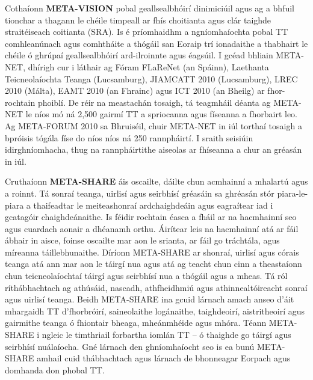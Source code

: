 \begin{multicols}{2}
Cothaíonn \textbf{META-VISION} pobal geallsealbhóirí dinimiciúil agus ag a bhfuil tionchar a thagann le chéile timpeall ar fhís choitianta agus clár taighde straitéiseach coitianta (SRA). Is é príomhaidhm a ngníomhaíochta pobal TT comhleanúnach agus comhtháite a thógáil san Eoraip trí ionadaithe a thabhairt le chéile ó ghrúpaí geallsealbhóirí ard-ilroinnte agus éagsúil. I gcéad bhliain META-NET, dhírigh cur i láthair ag Fóram FLaReNet (an Spáinn), Laethanta Teicneolaíochta Teanga (Lucsamburg), JIAMCATT 2010 (Lucsamburg), LREC 2010 (Málta), EAMT 2010 (an Fhrainc) agus ICT 2010 (an Bheilg) ar fhor-rochtain phoiblí. De réir na meastachán tosaigh, tá teagmháil déanta ag META-NET le níos mó ná 2,500 gairmí TT a spriocanna agus físeanna a fhorbairt leo. Ag META-FORUM 2010 sa Bhruiséil, chuir META-NET in iúl torthaí tosaigh a bpróisis tógála físe do níos níos ná 250 rannpháirtí. I sraith seisiúin idirghníomhacha, thug na rannpháirtithe aiseolas ar fhíseanna a chur an gréasán in iúl.

Cruthaíonn \textbf{META-SHARE} áis oscailte, dáilte chun acmhainní a mhalartú agus a roinnt. Tá sonraí teanga, uirlisí agus seirbhísí gréasáin sa ghréasán stór piara-le-piara a thaifeadtar le meiteashonraí ardchaighdeáin agus eagraítear iad i gcatagóir chaighdeánaithe. Is féidir rochtain éasca a fháil ar na hacmhainní seo agus cuardach aonair a dhéanamh orthu. Áirítear leis na hacmhainní atá ar fáil ábhair in aisce, foinse oscailte mar aon le srianta, ar fáil go tráchtála, agus míreanna táillebhunaithe. Díríonn META-SHARE ar shonraí, uirlisí agus córais teanga atá ann mar aon le táirgí nua agus atá ag teacht chun cinn a theastaíonn chun teicneolaíochtaí táirgí agus seirbhísí nua a thógáil agus a mheas. Tá ról ríthábhachtach ag athúsáid, nascadh, athfheidhmiú agus athinnealtóireacht sonraí agus uirlisí teanga. Beidh META-SHARE ina gcuid lárnach amach anseo d’áit mhargaidh TT d’fhorbróirí, saineolaithe logánaithe, taighdeoirí, aistritheoirí agus gairmithe teanga ó fhiontair bheaga, mheánmhéide agus mhóra. Téann META-SHARE i ngleic le timthriail forbartha iomlán TT – ó thaighde go táirgí agus seirbhísí nuálaíocha. Gné lárnach den ghníomhaíocht seo is ea bunú META-SHARE amhail cuid thábhachtach agus lárnach de bhonneagar Eorpach agus domhanda don phobal TT.


\end{multicols}
